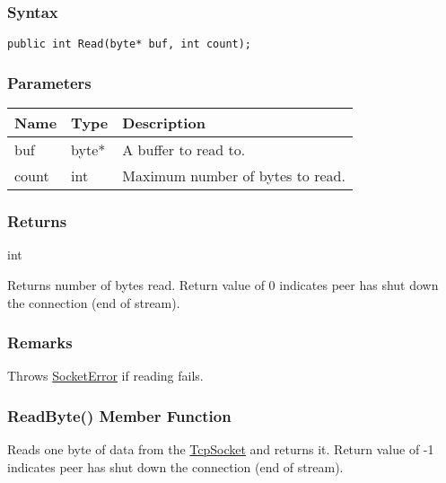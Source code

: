 \documentclass[a4paper,oneside,11.000000pt]{book}
\begin{document}
\subsubsection*{Syntax}\texttt{public int Read(byte* buf, int count);}

\subsubsection*{Parameters}
\begin{flushleft}
\begin{supertabular}[l]{lll}
\textbf{Name}
& \textbf{Type}
& \textbf{Description}
\\
\hline
buf
& byte*
& A buffer to read to.

\\
count
& int
& Maximum number of bytes to read.

\\
\end{supertabular}

\end{flushleft}
\subsubsection*{Returns}int
\begin{flushleft}
Returns number of bytes read.
Return value of 0 indicates peer has shut down the connection (end of stream).

\end{flushleft}
\subsubsection*{Remarks}
\begin{flushleft}
Throws \hyperlink{System.Net.Sockets.SocketError}{SocketError} if reading fails.

\end{flushleft}
\clearpage

\hypertarget{System.Net.Sockets.SocketByteStream.ReadByte.P.System.Net.Sockets.SocketByteStream}{\subsubsection*{ReadByte() Member Function}}
\begin{flushleft}
Reads one byte of data from the \hyperlink{System.Net.Sockets.TcpSocket}{TcpSocket} and returns it.
Return value of -1 indicates peer has shut down the connection (end of stream).

\end{flushleft}
\end{document}
